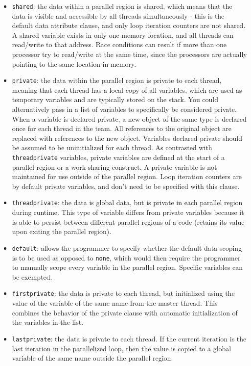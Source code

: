 \documentclass[10pt]{article}
\begin{document}
\begin{flushleft}
\begin{itemize}
\item {\tt shared}: the data within a parallel region is shared, which means that the data is visible and accessible by all threads simultaneously - this is the default data attribute clause, and only loop iteration counters are not shared. A shared variable exists in only one memory location, and all threads can read/write to that address. Race conditions can result if more than one processor try to read/write at the same time, since the processors are actually pointing to the same location in memory.
\item {\tt private}: the data within the parallel region is private to each thread, meaning that each thread has a local copy of all variables, which are used as temporary variables and are typically stored on the stack.  You could alternatively pass in a list of variables to specifically be considered private. When a variable is declared private, a new object of the same type is declared once for each thread in the team. All references to the original object are replaced with references to the new object. Variables declared private should be assumed to be uninitialized for each thread. As contrasted with {\tt threadprivate} variables, private variables are defined at the start of a parallel region or a work-sharing construct. A private variable is not maintained for use outside of the parallel region. Loop iteration counters are by default private variables, and don't need to be specified with this clause.
\item {\tt threadprivate}: the data is global data, but is private in each parallel region during runtime. This type of variable differs from private variables because it is able to persist between different parallel regions of a code (retains its value upon exiting the parallel region). 
\item {\tt default}: allows the programmer to specify whether the default data scoping is to be used as opposed to {\tt none}, which would then require the programmer to manually scope every variable in the parallel region. Specific variables can be exempted. 
\item {\tt firstprivate}: the data is private to each thread, but initialized using the value of the variable of the same name from the master thread. This combines the behavior of the private clause with automatic initialization of the variables in the list. 
\item {\tt lastprivate}: the data is private to each thread. If the current iteration is the last iteration in the parallelized loop, then the value is copied to a global variable of the same name outside the parallel region.

\end{itemize}
\end{flushleft}
\end{document}
